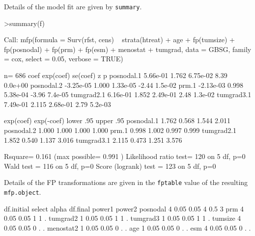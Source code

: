 \documentclass[11pt]{article}
\begin{document}
Details of the model fit are given by {\tt summary}. 

\begin{Schunk}
\begin{Sinput}
>summary(f)
\end{Sinput}
\begin{Soutput}
Call:
mfp(formula = Surv(rfst, cens) ~ strata(htreat) + age + fp(tumsize) + 
    fp(posnodal) + fp(prm) + fp(esm) + menostat + tumgrad, data = GBSG, 
    family = cox, select = 0.05, verbose = TRUE)

  n= 686 
                coef exp(coef) se(coef)     z       p
posnodal.1  5.66e-01     1.762 6.75e-02  8.39 0.0e+00
posnodal.2 -3.25e-05     1.000 1.33e-05 -2.44 1.5e-02
prm.1      -2.13e-03     0.998 5.38e-04 -3.96 7.4e-05
tumgrad2.1  6.16e-01     1.852 2.49e-01  2.48 1.3e-02
tumgrad3.1  7.49e-01     2.115 2.68e-01  2.79 5.2e-03

           exp(coef) exp(-coef) lower .95 upper .95
posnodal.1     1.762      0.568     1.544     2.011
posnodal.2     1.000      1.000     1.000     1.000
prm.1          0.998      1.002     0.997     0.999
tumgrad2.1     1.852      0.540     1.137     3.016
tumgrad3.1     2.115      0.473     1.251     3.576

Rsquare= 0.161   (max possible= 0.991 )
Likelihood ratio test= 120  on 5 df,   p=0
Wald test            = 116  on 5 df,   p=0
Score (logrank) test = 123  on 5 df,   p=0
\end{Soutput}
\end{Schunk}

Details of the FP transformations are given in the  {\tt fptable} value of the resulting \texttt{mfp.object}.

\begin{Schunk}
\begin{Soutput}
          df.initial select alpha df.final power1 power2
posnodal           4   0.05  0.05        4    0.5      3
prm                4   0.05  0.05        1      1      .
tumgrad2           1   0.05  0.05        1      1      .
tumgrad3           1   0.05  0.05        1      1      .
tumsize            4   0.05  0.05        0      .      .
menostat2          1   0.05  0.05        0      .      .
age                1   0.05  0.05        0      .      .
esm                4   0.05  0.05        0      .      .
\end{Soutput}
\end{Schunk}
\end{document}

